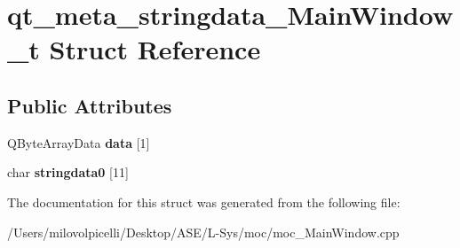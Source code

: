 \hypertarget{structqt__meta__stringdata___main_window__t}{}\section{qt\+\_\+meta\+\_\+stringdata\+\_\+\+Main\+Window\+\_\+t Struct Reference}
\label{structqt__meta__stringdata___main_window__t}
\subsection*{Public Attributes}
\begin{DoxyCompactItemize}
\item 
\mbox{\label{structqt__meta__stringdata___main_window__t_a0ae2a8bf39f0690707c6a48ca1585d31}} 
Q\+Byte\+Array\+Data {\bfseries data} \mbox{[}1\mbox{]}
\item 
\mbox{\label{structqt__meta__stringdata___main_window__t_a9779ce86858769bbae7d2cb0c461d77c}} 
char {\bfseries stringdata0} \mbox{[}11\mbox{]}
\end{DoxyCompactItemize}


The documentation for this struct was generated from the following file\+:\begin{DoxyCompactItemize}
\item 
/\+Users/milovolpicelli/\+Desktop/\+A\+S\+E/\+L-\/\+Sys/moc/moc\+\_\+\+Main\+Window.\+cpp\end{DoxyCompactItemize}
